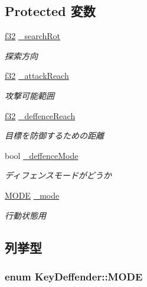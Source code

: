 \subsection*{Protected 変数}
\begin{DoxyCompactItemize}
\item 
\hyperlink{_main_8h_a5f6906312a689f27d70e9d086649d3fd}{f32} \hyperlink{class_key_deffender_acb50cc4c7f821904eb07c27de131cf4a}{\-\_\-search\-Rot}
\begin{DoxyCompactList}\small\item\em 探索方向 \end{DoxyCompactList}\item 
\hyperlink{_main_8h_a5f6906312a689f27d70e9d086649d3fd}{f32} \hyperlink{class_key_deffender_a3f735f15f49aa4402f90b11df8de24f0}{\-\_\-attack\-Reach}
\begin{DoxyCompactList}\small\item\em 攻撃可能範囲 \end{DoxyCompactList}\item 
\hyperlink{_main_8h_a5f6906312a689f27d70e9d086649d3fd}{f32} \hyperlink{class_key_deffender_a707f63b922b484c455d715d9aee813e9}{\-\_\-deffence\-Reach}
\begin{DoxyCompactList}\small\item\em 目標を防御するための距離 \end{DoxyCompactList}\item 
bool \hyperlink{class_key_deffender_a0451857ef4707d1f98a3259be12be695}{\-\_\-deffence\-Mode}
\begin{DoxyCompactList}\small\item\em ディフェンスモードがどうか \end{DoxyCompactList}\item 
\hyperlink{class_key_deffender_a2d0fa24da9c8801e29e09785e96532c5}{M\-O\-D\-E} \hyperlink{class_key_deffender_ab95b209ff1600e6425422d644c05ffb7}{\-\_\-mode}
\begin{DoxyCompactList}\small\item\em 行動状態用 \end{DoxyCompactList}\end{DoxyCompactItemize}


\subsection{列挙型}
\hypertarget{class_key_deffender_a2d0fa24da9c8801e29e09785e96532c5}{
\subsubsection[{M\-O\-D\-E}]{\setlength{\rightskip}{0pt plus 5cm}enum {\bf Key\-Deffender\-::\-M\-O\-D\-E}}}\label{class_key_deffender_a2d0fa24da9c8801e29e09785e96532c5}


